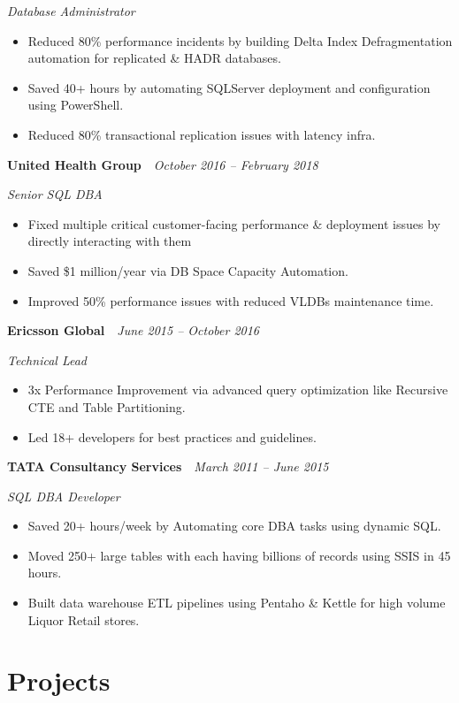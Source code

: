 \documentclass[10pt,a4paper]{article}
\begin{document}
\textit{Database Administrator}
\begin{itemize}
  \item Reduced 80\% performance incidents by building Delta Index Defragmentation automation for replicated \& HADR databases.
  \item Saved 40+ hours by automating SQLServer deployment and configuration using PowerShell.
  \item Reduced 80\% transactional replication issues with latency infra.
\end{itemize}

\noindent\textbf{United Health Group}~\hfill~\textit{October 2016 -- February 2018}

\textit{Senior SQL DBA}
\begin{itemize}
  \item Fixed multiple critical customer-facing performance \& deployment issues by directly interacting with them
  \item Saved \$1 million/year via DB Space Capacity Automation.
  \item Improved 50\% performance issues with reduced VLDBs maintenance time.
\end{itemize}

\noindent\textbf{Ericsson Global}~\hfill~\textit{June 2015 -- October 2016}

\textit{Technical Lead}
\begin{itemize}
  \item 3x Performance Improvement via advanced query optimization like Recursive CTE and Table Partitioning.
  \item Led 18+ developers for best practices and guidelines.
\end{itemize}

\noindent\textbf{TATA Consultancy Services}~\hfill~\textit{March 2011 -- June 2015}

\textit{SQL DBA Developer}
\begin{itemize}
  \item Saved 20+ hours/week by Automating core DBA tasks using dynamic SQL.
  \item Moved 250+ large tables with each having billions of records using SSIS in 45 hours.
  \item Built data warehouse ETL pipelines using Pentaho \& Kettle for high volume Liquor Retail stores.
\end{itemize}

\section{Projects}
\end{document}
